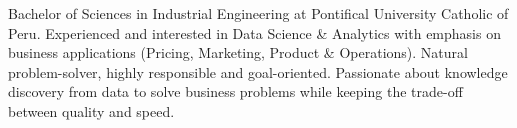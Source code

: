 
Bachelor of Sciences in Industrial Engineering at Pontifical University Catholic of Peru. Experienced and interested in Data Science \& Analytics with emphasis on business applications (Pricing, Marketing, Product \& Operations). Natural problem-solver, highly responsible and goal-oriented. Passionate about knowledge discovery from data to solve business problems while keeping the trade-off between quality and speed.

